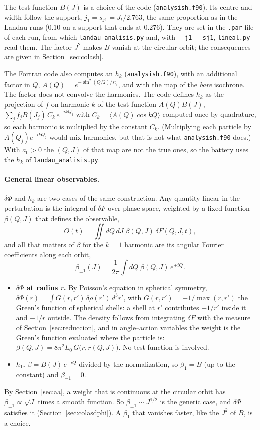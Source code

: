 \documentclass[11pt,a4paper]{article}
\begin{document}
The test function $B(J)$ is a choice of the code (\texttt{analysish.f90}). Its centre and
width follow the support, $j_1=s_{j1}=J_t/2.763$, the same proportion as in the Landau runs
($0.10$ on a support that ends at $0.276$). They are set in the \texttt{.par} file of each
run, from which \texttt{landau\_\allowbreak analisis.py} and, with \texttt{-{}-j1 -{}-sj1},
\texttt{lineal.py} read them. The factor $J^2$ makes $B$ vanish at the circular orbit; the
consequences are given in Section~\ref{sec:colash}.

The Fortran code also computes an $h_k$ (\texttt{analysish.f90}), with an additional factor
in $Q$, $A(Q)=e^{-\sin^2(Q/2)/s_Q^2}$, and with the map of the \emph{bare} isochrone. The factor
does not convolve the harmonics. The code defines $h_k$ as the projection of $f$ on
harmonic $k$ of the test function $A(Q)B(J)$, $\sum_jf_jB(J_j)\,C_k\,e^{-ikQ_j}$ with
$C_k=\langle A(Q)\cos kQ\rangle$ computed once by quadrature, so each harmonic is multiplied by
the constant $C_k$. (Multiplying each particle by $A(Q_j)e^{-ikQ_j}$ would mix harmonics,
but that is not what \texttt{analysish.f90} does.) With $a_0>0$ the $(Q,J)$ of that map are
not the true ones, so the battery uses the $h_k$ of \texttt{landau\_\allowbreak analisis.py}.

\paragraph{General linear observables.} $\delta\Phi$ and $h_k$ are two cases of the same
construction. Any quantity linear in the perturbation is the integral of $\delta F$ over
phase space, weighted by a fixed function $\beta(Q,J)$ that defines the observable,
\[
  O(t) = \iint dQ\,dJ\;\beta(Q,J)\,\delta F(Q,J,t),
\]
and all that matters of $\beta$ for the $k=1$ harmonic are its angular Fourier coefficients
along each orbit,
\[
  \beta_{\pm1}(J)=\frac{1}{2\pi}\int dQ\;\beta(Q,J)\,e^{\pm iQ}.
\]
\begin{itemize}
\item \textbf{$\delta\Phi$ at radius $r$.} By Poisson's equation in spherical symmetry,
$\delta\Phi(r)=\int G(r,r')\,\delta\rho(r')\,d^3r'$, with $G(r,r')=-1/\max(r,r')$ the Green's
function of spherical shells: a shell at $r'$ contributes $-1/r'$ inside it and $-1/r$
outside. The density follows from integrating $\delta F$ with the measure of
Section~\ref{sec:reduccion}, and in angle--action variables the weight is the Green's
function evaluated where the particle is: $\beta(Q,J)=8\pi^2L_0\,G\big(r,r(Q,J)\big)$. No test
function is involved.
\item \textbf{$h_1$.} $\beta=B(J)\,e^{-iQ}$ divided by the normalization, so $\beta_1=B$ (up to
the constant) and $\beta_{-1}=0$.
\end{itemize}
By Section~\ref{sec:aa}, a weight that is continuous at the circular orbit has
$\beta_{\pm1}\propto\sqrt J$ times a smooth function. So $\beta_{\pm1}\sim J^{1/2}$ is the generic
case, and $\delta\Phi$ satisfies it (Section~\ref{sec:colasdphi}). A $\beta_1$ that vanishes
faster, like the $J^2$ of $B$, is a choice.
\end{document}
